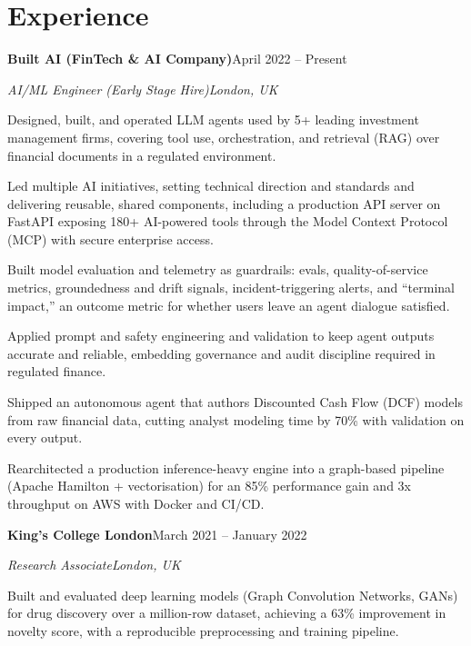 \documentclass[10pt,a4paper]{article}
\newcommand{\entry}[4]{%
  {\color{company}\bfseries #1}\hfill {\color{muted}#2}\par
  \vspace{1pt}
  {\itshape #3}\hfill {\color{muted}\itshape #4}\par
  \vspace{3pt}%
}
\begin{document}
\section{Experience}
\entry{Built AI (FinTech \& AI Company)}{April 2022 -- Present}{AI/ML Engineer (Early Stage Hire)}{London, UK}
\begin{tight}
  \item Designed, built, and operated LLM agents used by 5+ leading investment management firms, covering tool use, orchestration, and retrieval (RAG) over financial documents in a regulated environment.
  \item Led multiple AI initiatives, setting technical direction and standards and delivering reusable, shared components, including a production API server on FastAPI exposing 180+ AI-powered tools through the Model Context Protocol (MCP) with secure enterprise access.
  \item Built model evaluation and telemetry as guardrails: evals, quality-of-service metrics, groundedness and drift signals, incident-triggering alerts, and ``terminal impact,'' an outcome metric for whether users leave an agent dialogue satisfied.
  \item Applied prompt and safety engineering and validation to keep agent outputs accurate and reliable, embedding governance and audit discipline required in regulated finance.
  \item Shipped an autonomous agent that authors Discounted Cash Flow (DCF) models from raw financial data, cutting analyst modeling time by 70\% with validation on every output.
  \item Rearchitected a production inference-heavy engine into a graph-based pipeline (Apache Hamilton + vectorisation) for an 85\% performance gain and 3x throughput on AWS with Docker and CI/CD.
\end{tight}

\entry{King's College London}{March 2021 -- January 2022}{Research Associate}{London, UK}
\begin{tight}
  \item Built and evaluated deep learning models (Graph Convolution Networks, GANs) for drug discovery over a million-row dataset, achieving a 63\% improvement in novelty score, with a reproducible preprocessing and training pipeline.
\end{tight}

\end{document}
